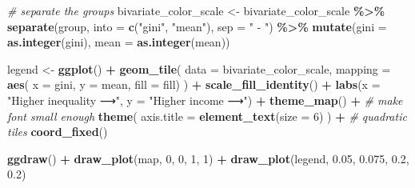 \documentclass[
]{article}
\newenvironment{Shaded}{\begin{snugshade}}{\end{snugshade}}
\newcommand{\AttributeTok}[1]{\textcolor[rgb]{0.13,0.29,0.53}{#1}}
\newcommand{\CommentTok}[1]{\textcolor[rgb]{0.56,0.35,0.01}{\textit{#1}}}
\newcommand{\DecValTok}[1]{\textcolor[rgb]{0.00,0.00,0.81}{#1}}
\newcommand{\FloatTok}[1]{\textcolor[rgb]{0.00,0.00,0.81}{#1}}
\newcommand{\FunctionTok}[1]{\textcolor[rgb]{0.13,0.29,0.53}{\textbf{#1}}}
\newcommand{\NormalTok}[1]{#1}
\newcommand{\OtherTok}[1]{\textcolor[rgb]{0.56,0.35,0.01}{#1}}
\newcommand{\SpecialCharTok}[1]{\textcolor[rgb]{0.81,0.36,0.00}{\textbf{#1}}}
\newcommand{\StringTok}[1]{\textcolor[rgb]{0.31,0.60,0.02}{#1}}
\begin{document}
\begin{Shaded}
\begin{Highlighting}[]
\CommentTok{\# separate the groups}
\NormalTok{bivariate\_color\_scale }\OtherTok{\textless{}{-}}\NormalTok{ bivariate\_color\_scale }\SpecialCharTok{\%\textgreater{}\%}
  \FunctionTok{separate}\NormalTok{(group, }\AttributeTok{into =} \FunctionTok{c}\NormalTok{(}\StringTok{"gini"}\NormalTok{, }\StringTok{"mean"}\NormalTok{), }\AttributeTok{sep =} \StringTok{" {-} "}\NormalTok{) }\SpecialCharTok{\%\textgreater{}\%}
  \FunctionTok{mutate}\NormalTok{(}\AttributeTok{gini =} \FunctionTok{as.integer}\NormalTok{(gini),}
         \AttributeTok{mean =} \FunctionTok{as.integer}\NormalTok{(mean))}

\NormalTok{legend }\OtherTok{\textless{}{-}} \FunctionTok{ggplot}\NormalTok{() }\SpecialCharTok{+}
  \FunctionTok{geom\_tile}\NormalTok{(}
    \AttributeTok{data =}\NormalTok{ bivariate\_color\_scale,}
    \AttributeTok{mapping =} \FunctionTok{aes}\NormalTok{(}
      \AttributeTok{x =}\NormalTok{ gini,}
      \AttributeTok{y =}\NormalTok{ mean,}
      \AttributeTok{fill =}\NormalTok{ fill)}
\NormalTok{  ) }\SpecialCharTok{+}
  \FunctionTok{scale\_fill\_identity}\NormalTok{() }\SpecialCharTok{+}
  \FunctionTok{labs}\NormalTok{(}\AttributeTok{x =} \StringTok{"Higher inequality ⟶️"}\NormalTok{,}
       \AttributeTok{y =} \StringTok{"Higher income ⟶️"}\NormalTok{) }\SpecialCharTok{+}
  \FunctionTok{theme\_map}\NormalTok{() }\SpecialCharTok{+}
  \CommentTok{\# make font small enough}
  \FunctionTok{theme}\NormalTok{(}
    \AttributeTok{axis.title =} \FunctionTok{element\_text}\NormalTok{(}\AttributeTok{size =} \DecValTok{6}\NormalTok{)}
\NormalTok{  ) }\SpecialCharTok{+}
  \CommentTok{\# quadratic tiles}
  \FunctionTok{coord\_fixed}\NormalTok{()}
\end{Highlighting}
\end{Shaded}

\begin{Shaded}
\begin{Highlighting}[]
\FunctionTok{ggdraw}\NormalTok{() }\SpecialCharTok{+}
  \FunctionTok{draw\_plot}\NormalTok{(map, }\DecValTok{0}\NormalTok{, }\DecValTok{0}\NormalTok{, }\DecValTok{1}\NormalTok{, }\DecValTok{1}\NormalTok{) }\SpecialCharTok{+}
  \FunctionTok{draw\_plot}\NormalTok{(legend, }\FloatTok{0.05}\NormalTok{, }\FloatTok{0.075}\NormalTok{, }\FloatTok{0.2}\NormalTok{, }\FloatTok{0.2}\NormalTok{)}
\end{Highlighting}
\end{Shaded}
\end{document}
